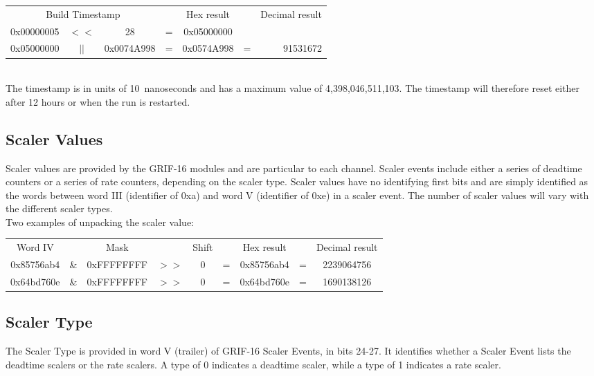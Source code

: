 \documentclass[letterpaper,12pt,notitlepage]{report}
\begin{document}
\begin{tabular}{ccccccr}
\multicolumn{3}{c}{Build Timestamp} & & Hex result & & Decimal result\\
0x00000005 & $<<$ & 28 & = & 0x05000000\\
0x05000000 & $||$ & 0x0074A998 & = & 0x0574A998 & = & 91531672\\
\end{tabular}\\


The timestamp is in units of 10~nanoseconds and has a maximum value of 4,398,046,511,103. The timestamp will therefore reset either after 12 hours or when the run is restarted.\\

\subsection{Scaler Values}
Scaler values are provided by the GRIF-16 modules and are particular to each channel. Scaler events include either a series of deadtime counters or a series of rate counters, depending on the scaler type. Scaler values have no identifying first bits and are simply identified as the words between word III (identifier of 0xa) and word V (identifier of 0xe) in a scaler event. The number of scaler values will vary with the different scaler types.\\

Two examples of unpacking the scaler value:\\

\begin{tabular}{ccccccccc}
Word IV &  & Mask & & Shift & & Hex result & & Decimal result\\
0x85756ab4 & \& & 0xFFFFFFFF & $>>$ & 0 & = & 0x85756ab4 & = & 2239064756\\
0x64bd760e & \& & 0xFFFFFFFF & $>>$ & 0 & = & 0x64bd760e & = & 1690138126\\
\end{tabular}

\subsection{Scaler Type}
The Scaler Type is provided in word V (trailer) of GRIF-16 Scaler Events, in bits 24-27. It identifies whether a Scaler Event lists the deadtime scalers or the rate scalers. A type of 0 indicates a deadtime scaler, while a type of 1 indicates a rate scaler.\\
\end{document}
